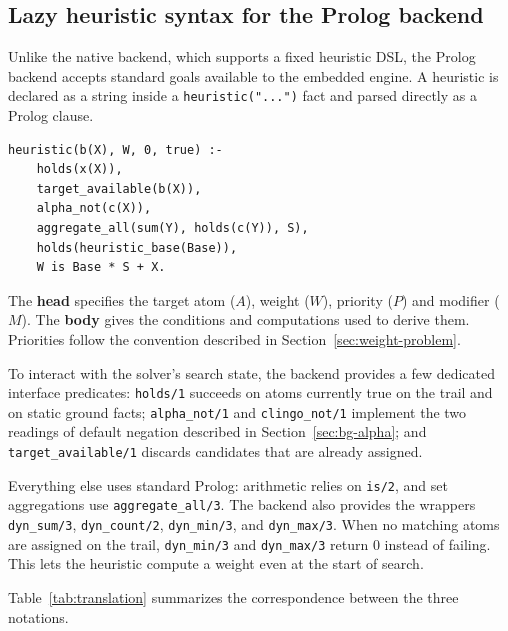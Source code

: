 \subsection{Lazy heuristic syntax for the Prolog backend}
\label{sec:prolog-notation}

Unlike the native backend, which supports a fixed heuristic DSL, the Prolog backend accepts standard goals available to the embedded engine. A heuristic is declared as a string inside a \texttt{heuristic("...")} fact and parsed directly as a Prolog clause.

\begin{verbatim}
heuristic(b(X), W, 0, true) :-
    holds(x(X)),
    target_available(b(X)),
    alpha_not(c(X)),
    aggregate_all(sum(Y), holds(c(Y)), S),
    holds(heuristic_base(Base)),
    W is Base * S + X.
\end{verbatim}

The \textbf{head} specifies the target atom ($A$), weight ($W$), priority ($P$) and modifier ($M$). The \textbf{body} gives the conditions and computations used to derive them. Priorities follow the convention described in Section~\ref{sec:weight-problem}.

To interact with the solver's search state, the backend provides a few dedicated interface predicates: \texttt{holds/1} succeeds on atoms currently true on the trail and on static ground facts; \texttt{alpha\_not/1} and \texttt{clingo\_not/1} implement the two readings of default negation described in Section~\ref{sec:bg-alpha}; and \texttt{target\_available/1} discards candidates that are already assigned.

Everything else uses standard Prolog: arithmetic relies on \texttt{is/2}, and set aggregations use \texttt{aggregate\_all/3}. The backend also provides the wrappers \texttt{dyn\_sum/3}, \texttt{dyn\_count/2}, \texttt{dyn\_min/3}, and \texttt{dyn\_max/3}. When no matching atoms are assigned on the trail, \texttt{dyn\_min/3} and \texttt{dyn\_max/3} return $0$ instead of failing. This lets the heuristic compute a weight even at the start of search.

Table~\ref{tab:translation} summarizes the correspondence between the three notations.


